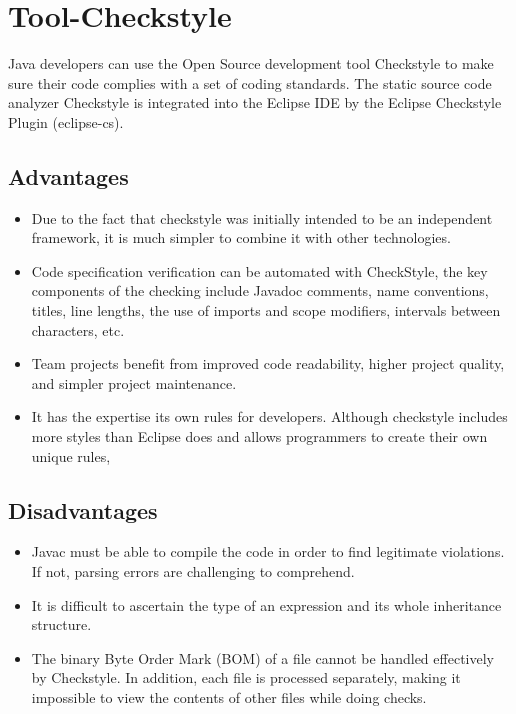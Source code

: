 \documentclass[a4paper, 11pt]{article}
\begin{document}
\section{Tool-Checkstyle}
Java developers can use the Open Source development tool Checkstyle to make sure their code complies with a set of coding standards. The static source code analyzer Checkstyle is integrated into the Eclipse IDE by the Eclipse Checkstyle Plugin (eclipse-cs).

\subsection{Advantages}
\begin{itemize}
    \item{Due to the fact that checkstyle was initially intended to be an independent framework, it is much simpler to combine it with other technologies.}
    
    \item{Code specification verification can be automated with CheckStyle, the key components of the checking include Javadoc comments, name conventions, titles, line lengths, the use of imports and scope modifiers, intervals between characters, etc.}
    
    \item{Team projects benefit from improved code readability, higher project quality, and simpler project maintenance.}
    
    \item{It has the expertise its own rules for developers. Although checkstyle includes more styles than Eclipse does and allows programmers to create their own unique rules,}
\end{itemize}

\subsection{Disadvantages}
\begin{itemize}
    \item{Javac must be able to compile the code in order to find legitimate violations. If not, parsing errors are challenging to comprehend.}
    
    \item{It is difficult to ascertain the type of an expression and its whole inheritance structure.}
    
    \item{The binary Byte Order Mark (BOM) of a file cannot be handled effectively by Checkstyle. In addition, each file is processed separately, making it impossible to view the contents of other files while doing checks.}
\end{itemize}
\end{document}

